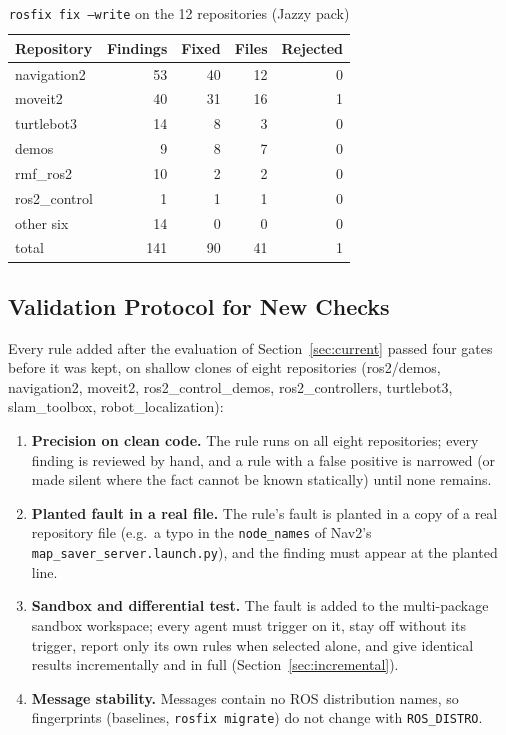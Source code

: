 \documentclass[conference]{IEEEtran}
\newcommand{\code}[1]{\texttt{#1}}
\begin{document}
\begin{table}[t]
\centering
\caption{\code{rosfix fix --write} on the 12 repositories (Jazzy pack)}
\label{tab:fixcorpus}
\footnotesize
\begin{tabular}{@{}lrrrr@{}}
\toprule
Repository & Findings & Fixed & Files & Rejected\\
\midrule
navigation2   & 53 & 40 & 12 & 0\\
moveit2       & 40 & 31 & 16 & 1\\
turtlebot3    & 14 &  8 &  3 & 0\\
demos         &  9 &  8 &  7 & 0\\
rmf\_ros2     & 10 &  2 &  2 & 0\\
ros2\_control &  1 &  1 &  1 & 0\\
other six     & 14 &  0 &  0 & 0\\
\midrule
total         & 141 & 90 & 41 & 1\\
\bottomrule
\end{tabular}
\end{table}

\subsection{Validation Protocol for New Checks}
\label{sec:protocol}

Every rule added after the evaluation of Section~\ref{sec:current} passed four gates before it
was kept, on shallow clones of eight repositories (ros2/demos, navigation2, moveit2,
ros2\_control\_demos, ros2\_controllers, turtlebot3, slam\_toolbox, robot\_localization):

\begin{enumerate}
\item \textbf{Precision on clean code.} The rule runs on all eight repositories; every finding is
  reviewed by hand, and a rule with a false positive is narrowed (or made silent where the fact
  cannot be known statically) until none remains.
\item \textbf{Planted fault in a real file.} The rule's fault is planted in a copy of a real
  repository file (e.g.\ a typo in the \code{node\_names} of Nav2's
  \code{map\_saver\_server.launch.py}), and the finding must appear at the planted line.
\item \textbf{Sandbox and differential test.} The fault is added to the multi-package sandbox
  workspace; every agent must trigger on it, stay off without its trigger, report only its own
  rules when selected alone, and give identical results incrementally and in full
  (Section~\ref{sec:incremental}).
\item \textbf{Message stability.} Messages contain no ROS distribution names, so fingerprints
  (baselines, \code{rosfix migrate}) do not change with \code{ROS\_DISTRO}.
\end{enumerate}
\end{document}

